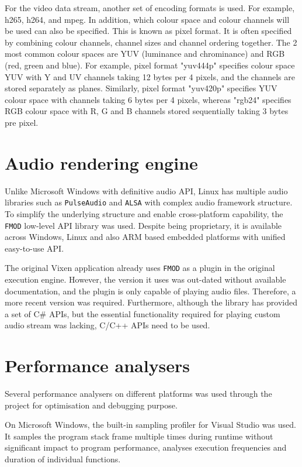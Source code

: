 For the video data stream, another set of encoding formats is used. For example, h265, h264, and mpeg. In addition, which colour space and colour channels will be used can also be specified. This is known as pixel format. It is often specified by combining colour channels, channel sizes and channel ordering together. The 2 most common colour spaces are YUV (luminance and chrominance) and RGB (red, green and blue). For example, pixel format "yuv444p" specifies colour space YUV with Y and UV channels taking 12 bytes per 4 pixels, and the channels are stored separately as planes. Similarly, pixel format "yuv420p" specifies YUV colour space with channels taking 6 bytes per 4 pixels, whereas "rgb24" specifies RGB colour space with R, G and B channels stored sequentially taking 3 bytes pre pixel.

\section{Audio rendering engine}

Unlike Microsoft Windows with definitive audio API, Linux has multiple audio libraries such as \texttt{PulseAudio} \cite{developers2013pulseaudio} and \texttt{ALSA} \cite{alsa} with complex audio framework structure. To simplify the underlying structure and enable cross-platform capability, the \texttt{FMOD} \cite{fmod} low-level API library was used. Despite being proprietary, it is available across Windows, Linux and also ARM based embedded platforms with unified easy-to-use API.

The original Vixen application already uses \texttt{FMOD} as a plugin in the original execution engine. However, the version it uses was out-dated without available documentation, and the plugin is only capable of playing audio files. Therefore, a more recent version was required. Furthermore, although the library has provided a set of C\# APIs, but the essential functionality required for playing custom audio stream was lacking, C/C++ APIs need to be used.

\section{Performance analysers}

Several performance analysers on different platforms was used through the project for optimisation and debugging purpose.

On Microsoft Windows, the built-in sampling profiler for Visual Studio was used. It samples the program stack frame multiple times during runtime without significant impact to program performance, analyses execution frequencies and duration of individual functions.

